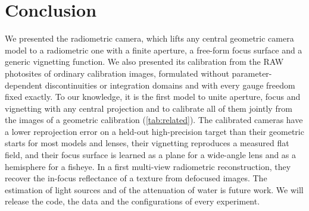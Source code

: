\section{Conclusion}
We presented the radiometric camera, which lifts any central geometric
camera model to a radiometric one with a finite aperture, a free-form
focus surface and a generic vignetting function. We also presented its
calibration from the RAW photosites of ordinary calibration images,
formulated without parameter-dependent discontinuities or integration
domains and with every gauge freedom fixed exactly. To our knowledge,
it is the first model to unite aperture, focus and vignetting with
any central projection and to calibrate all of them jointly from the
images of a geometric calibration (\cref{tab:related}). The calibrated
cameras have a lower reprojection error on a held-out high-precision
target than their geometric starts for most models and lenses, their
vignetting reproduces a measured flat field, and their focus surface
is learned as a plane for a wide-angle lens and as a hemisphere for a
fisheye. In a first multi-view radiometric reconstruction, they
recover the in-focus reflectance of a texture from defocused images.
The estimation of light sources and of the attenuation of water
is future work. We will
release the code, the data and the configurations of every experiment.

